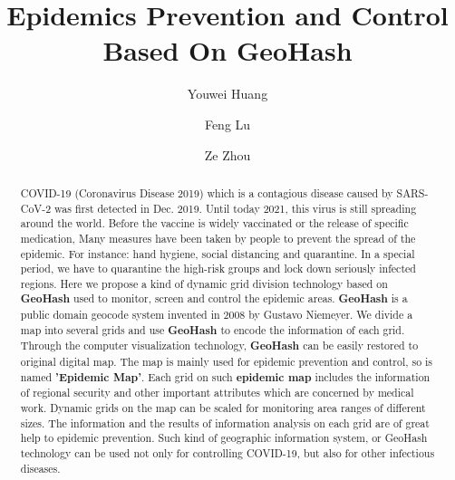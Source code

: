 \documentclass[sigplan,screen]{acmart}
\begin{document}
\title{Epidemics Prevention and Control Based On GeoHash}

\author{Youwei Huang}

\author{Feng Lu}

\author{Ze Zhou}

\begin{abstract}
	COVID-19 (Coronavirus Disease 2019) which is a contagious disease caused by SARS-CoV-2\cite{hu2020characteristics} was first detected in Dec. 2019.
	Until today 2021, this virus is still spreading around the world. Before the vaccine is widely vaccinated or the release of specific medication, Many measures have been taken by people to prevent the spread of the epidemic. For instance: hand hygiene, social distancing and quarantine.
	In a special period, we have to quarantine the high-risk groups and lock down seriously infected regions.
	Here we propose a kind of dynamic grid division technology based on \textbf{GeoHash} used to monitor, screen and control the epidemic areas.
	\textbf{GeoHash} is a public domain geocode system invented in 2008 by Gustavo Niemeyer\cite{niemeyer2008geohash}.
	We divide a map into several grids and use \textbf{GeoHash} to encode the information of each grid.
	Through the computer visualization technology, \textbf{GeoHash} can be easily restored to original digital map.
	The map is mainly used for epidemic prevention and control, so is named \textbf{'Epidemic Map'}. Each grid on such \textbf{epidemic map} includes the information of regional security and other important attributes which are concerned by medical work.
	Dynamic grids on the map can be scaled for monitoring area ranges of different sizes.
	The information and the results of information analysis on each grid are of great help to epidemic prevention.
	Such kind of geographic information system, or GeoHash technology can be used not only for controlling COVID-19, but also for other infectious diseases.
\end{abstract}

\end{document}
